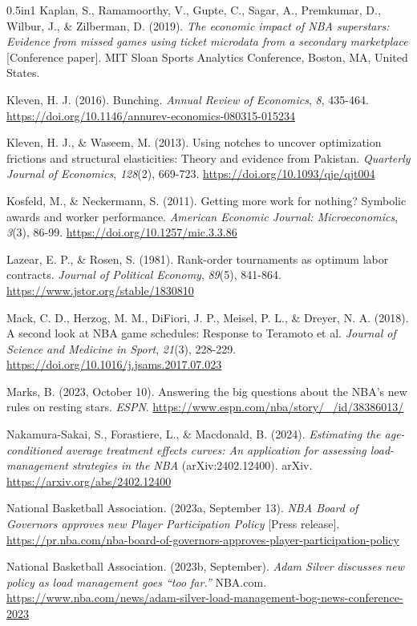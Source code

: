 \documentclass[12pt]{article}
\begin{document}
\begin{hangparas}{0.5in}{1}
Kaplan, S., Ramamoorthy, V., Gupte, C., Sagar, A., Premkumar, D., Wilbur, J., \& Zilberman, D. (2019). \emph{The economic impact of NBA superstars: Evidence from missed games using ticket microdata from a secondary marketplace} [Conference paper]. MIT Sloan Sports Analytics Conference, Boston, MA, United States.

Kleven, H. J. (2016). Bunching. \emph{Annual Review of Economics}, \emph{8}, 435-464. \url{https://doi.org/10.1146/annurev-economics-080315-015234}

Kleven, H. J., \& Waseem, M. (2013). Using notches to uncover optimization frictions and structural elasticities: Theory and evidence from Pakistan. \emph{Quarterly Journal of Economics}, \emph{128}(2), 669-723. \url{https://doi.org/10.1093/qje/qjt004}

Kosfeld, M., \& Neckermann, S. (2011). Getting more work for nothing? Symbolic awards and worker performance. \emph{American Economic Journal: Microeconomics}, \emph{3}(3), 86-99. \url{https://doi.org/10.1257/mic.3.3.86}

Lazear, E. P., \& Rosen, S. (1981). Rank-order tournaments as optimum labor contracts. \emph{Journal of Political Economy}, \emph{89}(5), 841-864. \url{https://www.jstor.org/stable/1830810}

Mack, C. D., Herzog, M. M., DiFiori, J. P., Meisel, P. L., \& Dreyer, N. A. (2018). A second look at NBA game schedules: Response to Teramoto et al. \emph{Journal of Science and Medicine in Sport}, \emph{21}(3), 228-229. \url{https://doi.org/10.1016/j.jsams.2017.07.023}

Marks, B. (2023, October 10). Answering the big questions about the NBA's new rules on resting stars. \emph{ESPN}. \url{https://www.espn.com/nba/story/_/id/38386013/}

Nakamura-Sakai, S., Forastiere, L., \& Macdonald, B. (2024). \emph{Estimating the age-conditioned average treatment effects curves: An application for assessing load-management strategies in the NBA} (arXiv:2402.12400). arXiv. \url{https://arxiv.org/abs/2402.12400}

National Basketball Association. (2023a, September 13). \emph{NBA Board of Governors approves new Player Participation Policy} [Press release]. \url{https://pr.nba.com/nba-board-of-governors-approves-player-participation-policy}

National Basketball Association. (2023b, September). \emph{Adam Silver discusses new policy as load management goes ``too far.''} NBA.com. \url{https://www.nba.com/news/adam-silver-load-management-bog-news-conference-2023}


\end{hangparas}
\end{document}
